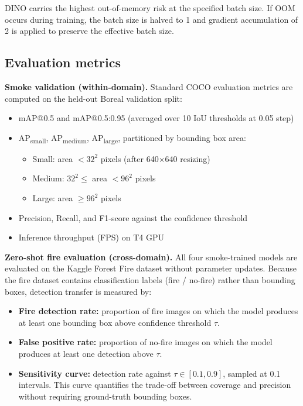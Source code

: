\documentclass[10pt,twocolumn]{article}
\begin{document}
DINO carries the highest out-of-memory risk at the specified batch size. If OOM occurs during training, the batch size is halved to 1 and gradient accumulation of 2 is applied to preserve the effective batch size.

\subsection{Evaluation metrics}

\textbf{Smoke validation (within-domain).} Standard COCO evaluation metrics are computed on the held-out Boreal validation split:
\begin{itemize}
    \item mAP@0.5 and mAP@0.5:0.95 (averaged over 10 IoU thresholds at 0.05 step)
    \item AP\textsubscript{small}, AP\textsubscript{medium}, AP\textsubscript{large}, partitioned by bounding box area:
    \begin{itemize}
        \item Small: area \(< 32^2\) pixels (after 640\(\times\)640 resizing)
        \item Medium: \(32^2 \leq\) area \(< 96^2\) pixels
        \item Large: area \(\geq 96^2\) pixels
    \end{itemize}
    \item Precision, Recall, and F1-score against the confidence threshold
    \item Inference throughput (FPS) on T4 GPU
\end{itemize}

\textbf{Zero-shot fire evaluation (cross-domain).} All four smoke-trained models are evaluated on the Kaggle Forest Fire dataset without parameter updates. Because the fire dataset contains classification labels (fire / no-fire) rather than bounding boxes, detection transfer is measured by:
\begin{itemize}
    \item \textbf{Fire detection rate:} proportion of fire images on which the model produces at least one bounding box above confidence threshold \(\tau\).
    \item \textbf{False positive rate:} proportion of no-fire images on which the model produces at least one detection above \(\tau\).
    \item \textbf{Sensitivity curve:} detection rate against \(\tau \in [0.1, 0.9]\), sampled at 0.1 intervals. This curve quantifies the trade-off between coverage and precision without requiring ground-truth bounding boxes.
\end{itemize}
\end{document}
